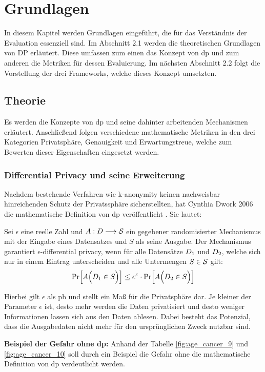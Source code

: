\chapter{Grundlagen}\label{sec:Chapter2}
In diesem Kapitel werden Grundlagen eingeführt, die für das Verständnis der Evaluation essenziell sind. Im Abschnitt 2.1 werden die theoretischen Grundlagen von DP erläutert. Diese umfassen zum einen das Konzept von \gls{dp} und zum anderen die Metriken für dessen Evaluierung. Im nächsten Abschnitt 2.2 folgt die Vorstellung der drei Frameworks, welche dieses Konzept umsetzten. 
\section{Theorie}
Es werden die Konzepte von \gls{dp} und seine dahinter arbeitenden Mechanismen erläutert. Anschließend folgen verschiedene mathematische Metriken in den drei Kategorien Privatsphäre, Genauigkeit und Erwartungstreue, welche zum Bewerten dieser Eigenschaften eingesetzt werden.
\subsection{Differential Privacy und seine Erweiterung}
Nachdem bestehende Verfahren wie k-anonymity keinen nachweisbar hinreichenden Schutz der Privatssphäre sicherstellten, hat Cynthia Dwork 2006 die mathematische Definition von \gls{dp} veröffentlicht \parencite{DPandSS2020}. Sie lautet: 

Sei $\epsilon$ eine reelle Zahl und $A : D\longrightarrow\mathcal{S}$ ein gegebener randomisierter Mechanismus mit der Eingabe eines Datensatzes und $S$ als seine Ausgabe. Der Mechanismus garantiert $\epsilon$-differential privacy, wenn für alle Datensätze $D_{1}$ und  $D_{2}$, welche sich nur in einem Eintrag unterscheiden und alle Untermengen $S \in \mathcal{S}$ gilt:
\begin{equation*}
	\Pr\Bigl[ A\Bigl( D_{1} \in S \Bigr) \Bigr]\leq  e^{\varepsilon} \cdot \Pr\Bigl[ A\Bigl( D_{2} \in S \Bigr) \Bigr]
\end{equation*}
\parencite{Seminar2017}

Hierbei gilt $\epsilon$ als \gls{pb} und stellt ein Maß für die Privatsphäre dar. Je kleiner der Parameter $\epsilon$ ist, desto mehr werden die Daten privatisiert und desto weniger Informationen lassen sich aus den Daten ablesen. Dabei besteht das Potenzial, dass die Ausgabedaten nicht mehr für den ursprünglichen Zweck nutzbar sind.

\textbf{Beispiel der Gefahr ohne \gls{dp}: }
Anhand der Tabelle \cref{fig:age_cancer_9} und \cref{fig:age_cancer_10} soll durch ein Beispiel \parencite{AlgoFoundations2014} die Gefahr ohne die mathematische Definition von \gls{dp} verdeutlicht werden.

